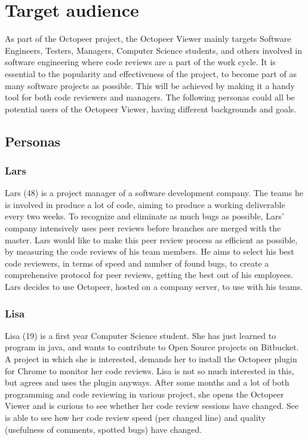 \documentclass{article}
\begin{document}
\section{Target audience}
As part of the Octopeer project, the Octopeer Viewer mainly targets Software Engineers, Testers, Managers, Computer Science students, and others involved in software engineering where code reviews are a part of the work cycle. It is essential to the popularity and effectiveness of the project, to become part of as many software projects as possible. This will be achieved by making it a handy tool for both code reviewers and managers. The following personas could all be potential users of the Octopeer Viewer, having different backgrounds and goals.

\subsection{Personas}
\subsubsection{Lars}
Lars (48) is a project manager of a software development company. The teams he is involved in produce a lot of code, aiming to produce a working deliverable every two weeks. To recognize and eliminate as much bugs as possible, Lars' company intensively uses peer reviews before branches are merged with the master. Lars would like to make this peer review process as efficient as possible, by measuring the code reviews of his team members. He aims to select his best code reviewers, in terms of speed and number of found bugs, to create a comprehensive protocol for peer reviews, getting the best out of his employees. Lars decides to use Octopeer, hosted on a company server, to use with his teams.

\subsubsection{Lisa}
Lisa (19) is a first year Computer Science student. She has just learned to program in java, and wants to contribute to Open Source projects on Bitbucket. A project in which she is interested, demands her to install the Octopeer plugin for Chrome to monitor her code reviews. Lisa is not so much interested in this, but agrees and uses the plugin anyways. After some months and a lot of both programming and code reviewing in various project, she opens the Octopeer Viewer and is curious to see whether her code review sessions have changed. See is able to see how her code review speed (per changed line) and quality (usefulness of comments, spotted bugs) have changed.
\end{document}
